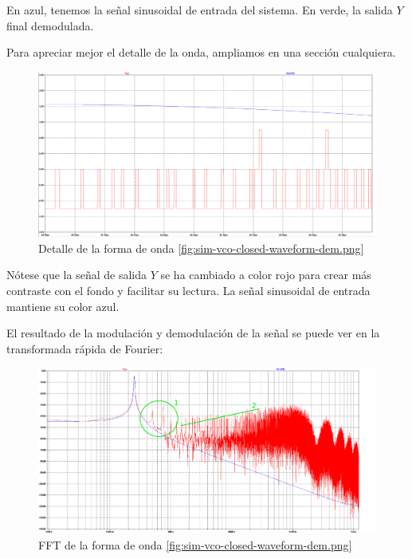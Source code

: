 \documentclass[12pt]{report} %
\begin{document}
	En azul, tenemos la señal sinusoidal de entrada del sistema. En verde, la salida $Y$ final demodulada.
	
	Para apreciar mejor el detalle de la onda, ampliamos en una sección cualquiera.
	
	\begin{figure}[H]
		\includegraphics[width=\textwidth]{sim-vco-closed-waveform-dem-zoom.png}
		\caption[Detalle de la forma de onda \ref{fig:sim-vco-closed-waveform-dem.png}]{Detalle de la forma de onda \ref{fig:sim-vco-closed-waveform-dem.png}}
		\label{fig:sim-vco-closed-waveform-dem-zoom.png}
	\end{figure}

	Nótese que la señal de salida $Y$ se ha cambiado a color rojo para crear más contraste con el fondo y facilitar su lectura. La señal sinusoidal de entrada mantiene su color azul.
	
	El resultado de la modulación y demodulación de la señal se puede ver en la transformada rápida de Fourier:
	
	\begin{figure}[H]
		\includegraphics[width=\textwidth]{sim-vco-closed-waveform-dem-fft-annotated.png}
		\caption[FFT de la forma de onda \ref{fig:sim-vco-closed-waveform-dem.png}]{FFT de la forma de onda \ref{fig:sim-vco-closed-waveform-dem.png}}
		\label{fig:sim-vco-closed-waveform-dem-fft.png}
	\end{figure}
	
\end{document}
